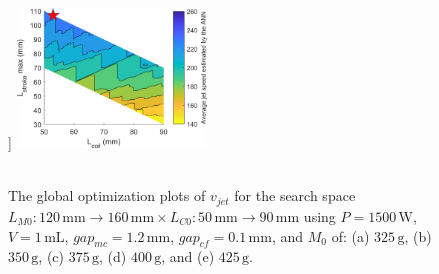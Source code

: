 \begin{figure}[!ht]
                ]{
                    \includegraphics[width=0.45\textwidth]{chap4/images/PMLSM_RSM_375g.png}
                    \label{fig:chapter/rsm/PMLSM/results/375}
                }
                \qquad
                \\
                \\
                \caption{
                    The global optimization plots of $v_{jet}$ for the search space $L_{M0}:120\,\mathrm{mm}\rightarrow 160\,\mathrm{mm} \times L_{C0}:50\,\mathrm{mm}\rightarrow 90\,\mathrm{mm}$ using $P=1500\,\mathrm{W}$, $V=1\,\mathrm{mL}$, $gap_{mc}=1.2\,\mathrm{mm}$, $gap_{cf}=0.1\,\mathrm{mm}$,  and $M_0$ of: (a) $325\,\mathrm{g}$, (b) $350\,\mathrm{g}$, (c) $375\,\mathrm{g}$, (d) $400\,\mathrm{g}$, and (e) $425\,\mathrm{g}$.
                }   \label{fig:chapter/rsm/PMLSM/results}
            \end{figure}
    

